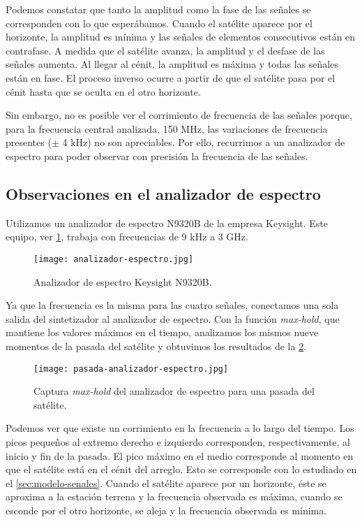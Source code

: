 \documentclass{article}
\newenvironment{standalone}{\begin{preview}}{\end{preview}}
\begin{document}
\begin{standalone}
  Podemos constatar que tanto la amplitud como la fase de las señales se corresponden con lo que esperábamos.
  Cuando el satélite aparece por el horizonte, la amplitud es mínima y las señales de elementos consecutivos están en contrafase.
  A medida que el satélite avanza, la amplitud y el desfase de las señales aumenta.
  Al llegar al cénit, la amplitud es máxima y todas las señales están en fase.
  El proceso inverso ocurre a partir de que el satélite pasa por el cénit hasta que se oculta en el otro horizonte.

  Sin embargo, no es posible ver el corrimiento de frecuencia de las señales porque, para la frecuencia central analizada, 150 MHz, las variaciones de frecuencia presentes ($\pm$ 4 kHz) no son apreciables.
  Por ello, recurrimos a un analizador de espectro para poder observar con precisión la frecuencia de las señales.

  \subsection{Observaciones en el analizador de espectro}

  Utilizamos un analizador de espectro N9320B de la empresa Keysight.
  Este equipo, ver \cref{fig:analizador-espectro}, trabaja con frecuencias de 9 kHz a 3 GHz.

  \begin{figure}[!htbp]
    \centering
    \texttt{[image: analizador-espectro.jpg]}
    \caption{Analizador de espectro Keysight N9320B.}
    \label{fig:analizador-espectro}
  \end{figure}

  Ya que la frecuencia es la misma para las cuatro señales, conectamos una sola salida del sintetizador al analizador de espectro.
  Con la función \textit{max-hold}, que mantiene los valores máximos en el tiempo, analizamos los mismos nueve momentos de la pasada del satélite y obtuvimos los resultados de la \cref{fig:pasada-analizador-espectro}.

  \begin{figure}[!htbp]
    \centering
    \texttt{[image: pasada-analizador-espectro.jpg]}
    \caption{Captura \textit{max-hold} del analizador de espectro para una pasada del satélite.}
    \label{fig:pasada-analizador-espectro}
  \end{figure}

  Podemos ver que existe un corrimiento en la frecuencia a lo largo del tiempo.
  Los picos pequeños al extremo derecho e izquierdo corresponden, respectivamente, al inicio y fin de la pasada.
  El pico máximo en el medio corresponde al momento en que el satélite está en el cénit del arreglo.
  Esto se corresponde con lo estudiado en el \cref{sec:modelo-senales}.
  Cuando el satélite aparece por un horizonte, éste se aproxima a la estación terrena y la frecuencia observada es máxima, cuando se esconde por el otro horizonte, se aleja y la frecuencia observada es mínima.


\end{standalone}
\end{document}
